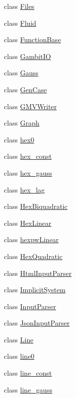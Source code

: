 \begin{DoxyCompactItemize}
class \mbox{\hyperlink{classfemus_1_1_files}{Files}}
\item 
class \mbox{\hyperlink{classfemus_1_1_fluid}{Fluid}}
\item 
class \mbox{\hyperlink{classfemus_1_1_function_base}{Function\+Base}}
\item 
class \mbox{\hyperlink{classfemus_1_1_gambit_i_o}{Gambit\+IO}}
\item 
class \mbox{\hyperlink{classfemus_1_1_gauss}{Gauss}}
\item 
class \mbox{\hyperlink{classfemus_1_1_gen_case}{Gen\+Case}}
\item 
class \mbox{\hyperlink{classfemus_1_1_g_m_v_writer}{G\+M\+V\+Writer}}
\item 
class \mbox{\hyperlink{classfemus_1_1_graph}{Graph}}
\item 
class \mbox{\hyperlink{classfemus_1_1hex0}{hex0}}
\item 
class \mbox{\hyperlink{classfemus_1_1hex__const}{hex\+\_\+const}}
\item 
class \mbox{\hyperlink{classfemus_1_1hex__gauss}{hex\+\_\+gauss}}
\item 
class \mbox{\hyperlink{classfemus_1_1hex__lag}{hex\+\_\+lag}}
\item 
class \mbox{\hyperlink{classfemus_1_1_hex_biquadratic}{Hex\+Biquadratic}}
\item 
class \mbox{\hyperlink{classfemus_1_1_hex_linear}{Hex\+Linear}}
\item 
class \mbox{\hyperlink{classfemus_1_1hexpw_linear}{hexpw\+Linear}}
\item 
class \mbox{\hyperlink{classfemus_1_1_hex_quadratic}{Hex\+Quadratic}}
\item 
class \mbox{\hyperlink{classfemus_1_1_html_input_parser}{Html\+Input\+Parser}}
\item 
class \mbox{\hyperlink{classfemus_1_1_implicit_system}{Implicit\+System}}
\item 
class \mbox{\hyperlink{classfemus_1_1_input_parser}{Input\+Parser}}
\item 
class \mbox{\hyperlink{classfemus_1_1_json_input_parser}{Json\+Input\+Parser}}
\item 
class \mbox{\hyperlink{classfemus_1_1_line}{Line}}
\item 
class \mbox{\hyperlink{classfemus_1_1line0}{line0}}
\item 
class \mbox{\hyperlink{classfemus_1_1line__const}{line\+\_\+const}}
\item 
class \mbox{\hyperlink{classfemus_1_1line__gauss}{line\+\_\+gauss}}

\end{DoxyCompactItemize}
